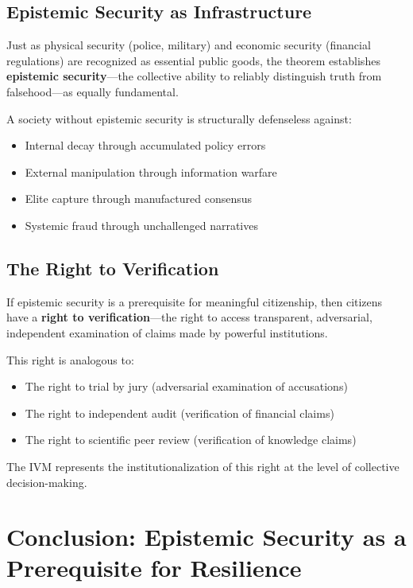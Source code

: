 \documentclass[11pt,a4paper]{article}
\begin{document}
\subsection{Epistemic Security as Infrastructure}

Just as physical security (police, military) and economic security (financial regulations) are recognized as essential public goods, the theorem establishes \textbf{epistemic security}---the collective ability to reliably distinguish truth from falsehood---as equally fundamental.

A society without epistemic security is structurally defenseless against:
\begin{itemize}
    \item Internal decay through accumulated policy errors
    \item External manipulation through information warfare
    \item Elite capture through manufactured consensus
    \item Systemic fraud through unchallenged narratives
\end{itemize}

\subsection{The Right to Verification}

If epistemic security is a prerequisite for meaningful citizenship, then citizens have a \textbf{right to verification}---the right to access transparent, adversarial, independent examination of claims made by powerful institutions.

This right is analogous to:
\begin{itemize}
    \item The right to trial by jury (adversarial examination of accusations)
    \item The right to independent audit (verification of financial claims)
    \item The right to scientific peer review (verification of knowledge claims)
\end{itemize}

The IVM represents the institutionalization of this right at the level of collective decision-making.

\section{Conclusion: Epistemic Security as a Prerequisite for Resilience}
\end{document}
